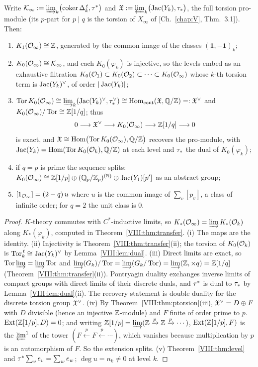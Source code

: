 \begin{theorem}\label{VIII:thm:klimit}
Write $\mathcal{K}_\infty:=\varinjlim_k\bigl(\operatorname{coker}\Delta_k^{\,t},\tau^*\bigr)$ and
$\mathfrak{X}:=\varprojlim_k\bigl(\operatorname{Jac}(Y_k),\tau_*\bigr)$, the full torsion pro-module (its $p$-part
for $p\mid q$ is the torsion of $X_\infty$ of {\rm[Ch.~\ref{chap:V}, Thm.~3.1]}). Then:
\begin{enumerate}
\item[(i)] $K_1(\mathcal{O}_\infty)\cong\mathbb{Z}$, generated by the common image of the classes
$(\mathbf1,-\mathbf1)_k$;
\item[(ii)] $K_0(\mathcal{O}_\infty)\cong\mathcal{K}_\infty$, and each $K_0(\varphi_k)$ is injective, so the
levels embed as an exhaustive filtration
$K_0(\mathcal{O}_1)\subset K_0(\mathcal{O}_2)\subset\cdots\subset K_0(\mathcal{O}_\infty)$ whose $k$-th torsion
term is $\operatorname{Jac}(Y_k)^{\vee}$, of order $|\operatorname{Jac}(Y_k)|$;
\item[(iii)] $\operatorname{Tor} K_0(\mathcal{O}_\infty)\cong\varinjlim_k(\operatorname{Jac}(Y_k)^{\vee},\tau_*^{\vee})
\cong\operatorname{Hom}_{\mathrm{cont}}(\mathfrak{X},\mathbb{Q}/\mathbb{Z})=:\mathfrak{X}^{\vee}$ and
$K_0(\mathcal{O}_\infty)/\operatorname{Tor}\cong\mathbb{Z}[1/q]$; thus
\[
0\longrightarrow\mathfrak{X}^{\vee}\longrightarrow K_0(\mathcal{O}_\infty)\longrightarrow\mathbb{Z}[1/q]\longrightarrow0
\]
is exact, and $\mathfrak{X}\cong\operatorname{Hom}\bigl(\operatorname{Tor} K_0(\mathcal{O}_\infty),\mathbb{Q}/\mathbb{Z}\bigr)$ recovers the pro-module,
with $\operatorname{Jac}(Y_k)=\operatorname{Hom}(\operatorname{Tor} K_0(\mathcal{O}_k),\mathbb{Q}/\mathbb{Z})$ at each level and $\tau_*$ the dual of
$K_0(\varphi_k)$;
\item[(iv)] if $q=p$ is prime the sequence splits:
$K_0(\mathcal{O}_\infty)\cong\mathbb{Z}[1/p]\oplus(\mathbb{Q}_p/\mathbb{Z}_p)^{(\mathbb N)}\oplus\operatorname{Jac}(Y_1)[p']$ as an abstract
group;
\item[(v)] $[1_{\mathcal{O}_\infty}]=(2-q)\,u$ where $u$ is the common image of $\sum_v[p_v]$, a
class of infinite order; for $q=2$ the unit class is $0$.
\end{enumerate}
\end{theorem}

\begin{proof}
$K$-theory commutes with $C^*$-inductive limits, so $K_*(\mathcal{O}_\infty)=\varinjlim K_*(\mathcal{O}_k)$
along $K_*(\varphi_k)$, computed in Theorem~\ref{VIII:thm:transfer}. (i) The maps are the
identity. (ii) Injectivity is Theorem~\ref{VIII:thm:transfer}(ii); the torsion of $K_0(\mathcal{O}_k)$
is $\operatorname{Tor}_k^{\,t}\cong\operatorname{Jac}(Y_k)^{\vee}$ by Lemma~\ref{VIII:lem:dual}. (iii) Direct limits are
exact, so $\operatorname{Tor}\varinjlim=\varinjlim\operatorname{Tor}$ and $\varinjlim(G_k)/\operatorname{Tor}=\varinjlim(G_k/\operatorname{Tor})
=\varinjlim(\mathbb{Z},\times q)=\mathbb{Z}[1/q]$ (Theorem~\ref{VIII:thm:transfer}(ii)). Pontryagin duality
exchanges inverse limits of compact groups with direct limits of their discrete duals,
and $\tau^*$ is dual to $\tau_*$ by Lemma~\ref{VIII:lem:dual}(ii). The recovery statement is
double duality for the discrete torsion group $\mathfrak{X}^{\vee}$. (iv) By
Theorem~\ref{VIII:thm:ptorsion}(iii), $\mathfrak{X}^{\vee}=D\oplus F$ with $D$ divisible (hence an
injective $\mathbb{Z}$-module) and $F$ finite of order prime to $p$. $\operatorname{Ext}(\mathbb{Z}[1/p],D)=0$; and
writing $\mathbb{Z}[1/p]=\varinjlim(\mathbb{Z}\xrightarrow{p}\mathbb{Z}\xrightarrow{p}\cdots)$,
$\operatorname{Ext}(\mathbb{Z}[1/p],F)$ is the $\varprojlim^1$ of the tower $(F\xleftarrow{p}F\xleftarrow{p}\cdots)$,
which vanishes because multiplication by $p$ is an automorphism of $F$. So the extension
splits. (v) Theorem~\ref{VIII:thm:level} and $\tau^*\sum_ve_v=\sum_we_w$; $\deg u=n_k\ne0$ at
level $k$.
\end{proof}

